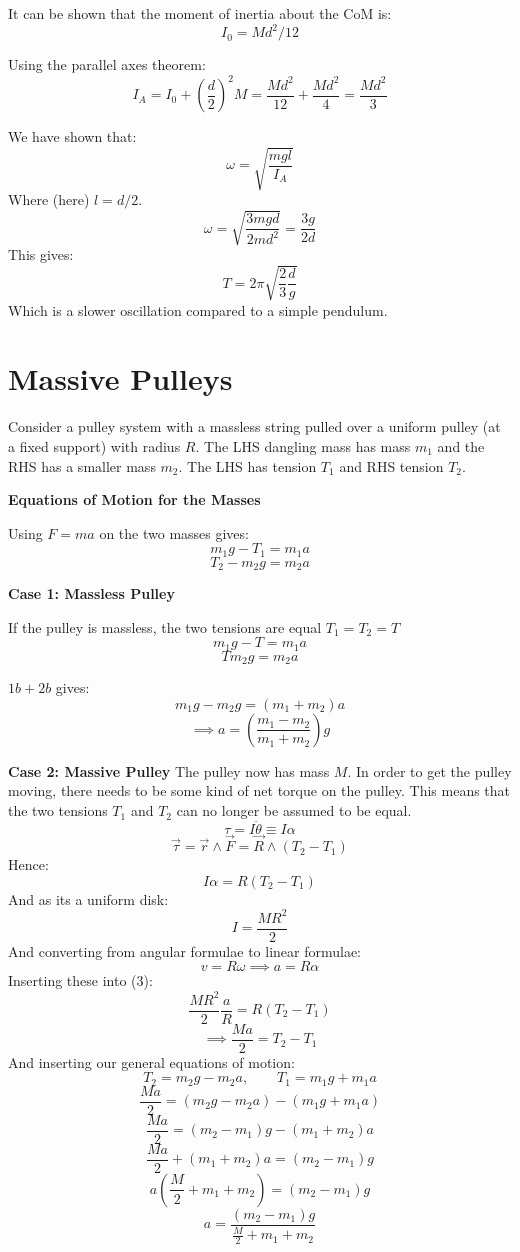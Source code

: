 It can be shown that the moment of inertia about the CoM is:
\[
    I_0 = Md^2 / 12
\]

Using the parallel axes theorem:
\[
    I_A = I_0 + \left(\frac{d}{2}\right)^2 M = \frac{Md^2}{12} + \frac{Md^2}{4} = \frac{Md^2}{3}
\]

We have shown that:
\[
\omega = \sqrt{\frac{mgl}{I_A}}
\]
Where (here) $l = d/2$.
\[
    \omega = \sqrt{\frac{3mgd}{2 md^2}} = \frac{3 g}{2d}
\]
This gives:
\[
    T = 2 \pi \sqrt{\frac{2}{3} \frac{d}{g}}
\]
Which is a slower oscillation compared to a simple pendulum.

\section{Massive Pulleys}
Consider a pulley system with a massless string pulled over a uniform pulley (at a fixed support) with radius $R$. The LHS dangling mass has mass $m_1$ and the RHS has a smaller mass $m_2$. The LHS has tension $T_1$ and RHS tension $T_2$. 

\textbf{Equations of Motion for the Masses}

Using $F = ma$ on the two masses gives:
\[
    m_1 g - T_1 = m_1 a \tag{1}
\]
\[
    T_2 - m_2 g = m_2 a \tag{2}
\]

\textbf{Case 1: Massless Pulley}

If the pulley is massless, the two tensions are equal $T_1 = T_2 = T$
\[
    m_1 g - T = m_1 a \tag{1b}
\]
\[
    T m_2 g = m_2 a \tag{2b}
\]

$1b + 2b$ gives:
\[
    m_1 g - m_2g = (m_1 + m_2)a
\]
\[
    \implies a = \left(\frac{m_1 - m_2}{m_1 + m_2}\right)g
\]

\textbf{Case 2: Massive Pulley}
The pulley now has mass $M$. In order to get the pulley moving, there needs to be some kind of net torque on the pulley. This means that the two tensions $T_1$ and $T_2$ can no longer be assumed to be equal.
\[
    \tau = I \ddot{\theta} \equiv I \alpha
\]
\[
    \vec{\tau} = \vec{r} \wedge \vec{F} = \vec{R} \wedge (T_2 - T_1)
\]
Hence:
\[
    I \alpha = R(T_2 - T_1) \tag{3}
\]
And as its a uniform disk:
\[
    I = \frac{MR^2}{2}
\]
And converting from angular formulae to linear formulae:
\[
    v = R \omega \implies a = R \alpha
\]
Inserting these into (3):
\[
    \frac{MR^2}{2} \frac{a}{R} = R(T_2 - T_1)
\]
\[
    \implies \frac{Ma}{2} = T_2 - T_1 \tag{4}
\]
And inserting our general equations of motion:
\[
    T_2 = m_2 g - m_2 a, \qquad T_1 = m_1 g + m_1 a
\]
\[
    \frac{Ma}{2} = (m_2 g - m_2 a) - (m_1 g + m_1 a)
\]
\[
    \frac{Ma}{2} = (m_2 - m_1)g - (m_1 + m_2)a
\]
\[
    \frac{Ma}{2} + (m_1 + m_2)a = (m_2 - m_1)g
\]
\[
    a\left(\frac{M}{2} + m_1 + m_2\right) = (m_2 - m_1)g
\]
\[
    \boxed{a = \frac{(m_2 - m_1)g}{\frac{M}{2} + m_1 + m_2}}
\]



